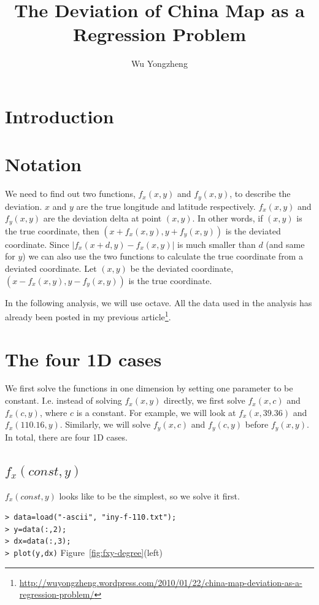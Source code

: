 \documentclass[a4paper]{article}
\begin{document}
\title{The Deviation of China Map as a Regression Problem}
\author{Wu Yongzheng}
\date{}

\maketitle

\section{Introduction}

\section{Notation}
We need to find out two functions, $f_x(x,y)$ and $f_y(x,y)$, to describe the
deviation. $x$ and $y$ are the true longitude and latitude respectively.
$f_x(x,y)$ and $f_y(x,y)$ are the deviation delta at point $(x,y)$.
In other words, if $(x,y)$ is the true coordinate, then
$(x+f_x(x,y),y+f_y(x,y))$ is the deviated coordinate.
Since $|f_x(x+d,y)-f_x(x,y)|$ is much smaller than $d$ (and same for $y$)
we can also
use the two functions to calculate the true coordinate from a deviated
coordinate.
Let $(x,y)$ be the deviated coordinate, $(x-f_x(x,y),y-f_y(x,y))$ is the
true coordinate.

In the following analysis, we will use octave.
All the data used in the analysis has already been posted in my previous
article\footnote{\url{http://wuyongzheng.wordpress.com/2010/01/22/china-map-deviation-as-a-regression-problem/}}.

\section{The four 1D cases}

We first solve the functions in one dimension by setting one parameter to be
constant.
I.e. instead of solving $f_x(x,y)$ directly, we first solve $f_x(x,c)$
and $f_x(c,y)$, where $c$ is a constant.
For example, we will look at $f_x(x,39.36)$ and $f_x(110.16,y)$.
Similarly, we will solve $f_y(x,c)$ and $f_y(c,y)$ before $f_y(x,y)$.
In total, there are four 1D cases.

\subsection{$f_x(const,y)$}
$f_x(const,y)$ looks like to be the simplest, so we solve it first.

\noindent
\verb|> data=load("-ascii", "iny-f-110.txt");| \\
\verb|> y=data(:,2);| \\
\verb|> dx=data(:,3);| \\
\verb|> plot(y,dx)| \hfill Figure~\ref{fig:fxy-degree}(left)
\end{document}
